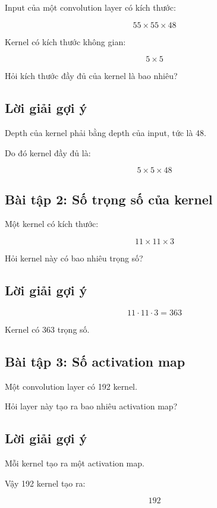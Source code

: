 Input của một convolution layer có kích thước:

\[
    55\times55\times48
\]

Kernel có kích thước không gian:

\[
    5\times5
\]

Hỏi kích thước đầy đủ của kernel là bao nhiêu?

\subsection*{Lời giải gợi ý}

Depth của kernel phải bằng depth của input, tức là 48.

Do đó kernel đầy đủ là:

\[
    5\times5\times48
\]

\subsection*{Bài tập 2: Số trọng số của kernel}

Một kernel có kích thước:

\[
    11\times11\times3
\]

Hỏi kernel này có bao nhiêu trọng số?

\subsection*{Lời giải gợi ý}

\[
    11\cdot11\cdot3=363
\]

Kernel có 363 trọng số.

\subsection*{Bài tập 3: Số activation map}

Một convolution layer có 192 kernel.

Hỏi layer này tạo ra bao nhiêu activation map?

\subsection*{Lời giải gợi ý}

Mỗi kernel tạo ra một activation map.

Vậy 192 kernel tạo ra:

\[
    192
\]

